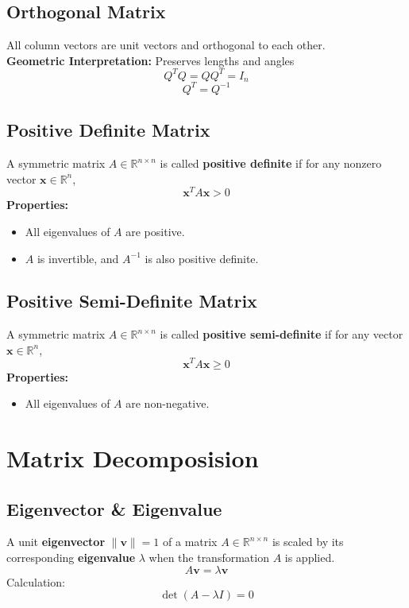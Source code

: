 \documentclass{article}
\begin{document}
\subsection{Orthogonal Matrix}
All column vectors are unit vectors and orthogonal to each other.\\
\textbf{Geometric Interpretation:} Preserves lengths and angles
\[
    Q^T Q = Q Q^T = I_n
\]
\[
    Q^T = Q^{-1}
\]

\subsection{Positive Definite Matrix}
A symmetric matrix $A \in \mathbb{R}^{n \times n}$ is called \textbf{positive definite} if for any nonzero vector $\mathbf{x} \in \mathbb{R}^n$,
\[
    \mathbf{x}^T A \mathbf{x} > 0
\]
\textbf{Properties:}
\begin{itemize}
    \item All eigenvalues of $A$ are positive.
    \item $A$ is invertible, and $A^{-1}$ is also positive definite.
\end{itemize}

\subsection{Positive Semi-Definite Matrix}
A symmetric matrix $A \in \mathbb{R}^{n \times n}$ is called \textbf{positive semi-definite} if for any vector $\mathbf{x} \in \mathbb{R}^n$,
\[
    \mathbf{x}^T A \mathbf{x} \geq 0
\]
\textbf{Properties:}
\begin{itemize}
    \item All eigenvalues of $A$ are non-negative.
\end{itemize}


\newpage
\section{Matrix Decomposision}

\subsection{Eigenvector \& Eigenvalue}

A unit \textbf{eigenvector} $\|\mathbf{v}\| = 1$ of a matrix $A \in \mathbb{R}^{n \times n}$ is scaled by its corresponding \textbf{eigenvalue} $\lambda$ when the transformation $A$ is applied.
\[
    A\mathbf{v} = \lambda \mathbf{v}
\]
Calculation:
\[
    \det(A - \lambda I) = 0
\]
\end{document}
